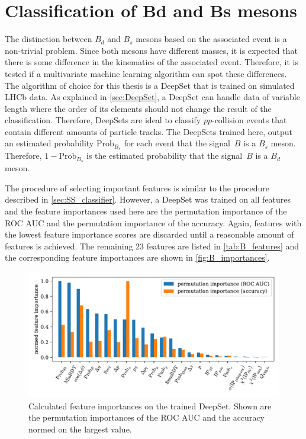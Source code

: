 \section{Classification of Bd and Bs mesons}

The distinction between $B_d$ and $B_s$ mesons based on the associated event is a non-trivial problem.
Since both mesons have different masses, it is expected that there is some difference in the kinematics of the associated event.
Therefore, it is tested if a multivariate machine learning algorithm can spot these differences.
The algorithm of choice for this thesis is a DeepSet that is trained on simulated LHCb data.
As explained in \autoref{sec:DeepSet}, a DeepSet can handle data of variable length where the order of its elements should not change the result of the classification.
Therefore, DeepSets are ideal to classify $pp$-collision events that contain different amounts of particle tracks.
The DeepSets trained here, output an estimated probability $\text{Prob}_{B_s}$ for each event that the signal~$B$ is a $B_s$ meson.%
Therefore, $1-\text{Prob}_{B_s}$ is the estimated probability that the signal~$B$ is a $B_d$ meson.

The procedure of selecting important features is similar to the procedure described in \autoref{sec:SS_classifier}.
However, a DeepSet was trained on all features and the feature importances used here are the permutation importance of the ROC AUC and the permutation importance of the accuracy.
Again, features with the lowest feature importance scores are discarded until a reasonable amount of features is achieved.
The remaining 23 features are listed in \autoref{tab:B_features} and the corresponding feature importances are shown in \autoref{fig:B_importances}.

\begin{figure}
    \centering
    \includegraphics[width=\textwidth]{images/B_feature_importances.pdf}
    \caption{Calculated feature importances on the trained DeepSet. Shown are the permutation importances of the ROC AUC and the accuracy normed on the largest value.}
    \label{fig:B_importances}
\end{figure}

